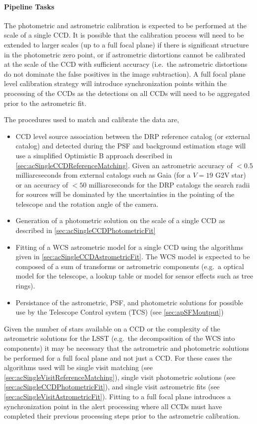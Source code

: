 \paragraph{Pipeline Tasks}

The photometric and astrometric calibration is expected to be performed at the scale of a single CCD. It is possible that the calibration process will need to be extended to larger scales (up to a full focal plane) if there is significant structure in the photometric zero point, or if astrometric distortions cannot be calibrated at the scale of the CCD with sufficient accuracy (i.e.\ the astrometric distortions do not dominate the false positives in the image subtraction). A full focal plane level calibration strategy will introduce synchronization points within the processing of the CCDs as the detections on all CCDs will need to be aggregated prior to the astrometric fit.

The procedures used to match and calibrate the data are,
\begin{itemize}
\item CCD level source association between the DRP reference catalog (or external catalog) and \Sources detected during the PSF and background estimation stage will use a simplified Optimistic B approach described in \ref{sec:acSingleCCDReferenceMatching}. Given an astrometric accuracy of $<0.5$ milliarcseconds from external catalogs such as Gaia (for a $V=19$ G2V star) or  an accuracy of $<50$ milliarcseconds for the DRP catalogs the search radii for sources will be dominated by the uncertainties in the pointing of the telescope and the rotation angle of the camera.
\item Generation of a photometric solution on the scale of a single CCD as described in \ref{sec:acSingleCCDPhotometricFit}
\item Fitting of a WCS astrometric model for a single CCD  using the algorithms given in \ref{sec:acSingleCCDAstrometricFit}. The WCS model is expected to be composed of a sum of transforms or astrometric components (e.g.\ a optical model for the telescope, a lookup table or model for sensor effects such as tree rings).
\item Persistance of the astrometric, PSF, and photometric solutions for possible use by the Telescope Control system (TCS) (see \ref{sec:apSFMoutput})
\end{itemize}

Given the number of stars available on a CCD or the complexity of the astrometric solutions for the LSST (e.g.\ the decomposition of the WCS into components) it may be necessary that the astrometric and photometric solutions be performed for a full focal plane and not just a CCD.  For these cases the algorithms used will be single visit matching (see \ref{sec:acSingleVisitReferenceMatching}),  single visit photometric solutions (see \ref{sec:acSingleCCDPhotometricFit}), and single visit astrometric fits (see \ref{sec:acSingleVisitAstrometricFit}). Fitting to a full focal plane introduces a synchronization point in the alert processing where all CCDs must have completed their previous processing steps prior to the astrometric calibration.

